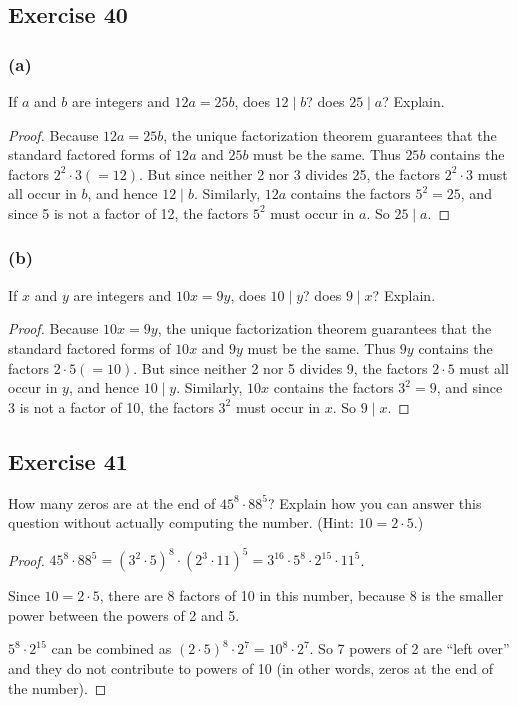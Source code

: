 \documentclass[14pt]{extarticle}
\begin{document}
\subsection{Exercise 40}
\subsubsection{(a)}
If $a$ and $b$ are integers and $12a = 25b$, does $12 \mid b$? does $25 \mid a$? Explain.

\begin{proof}
Because $12a = 25b$, the unique factorization theorem guarantees that the standard factored forms of $12a$ and $25b$ must be the same. Thus $25b$ contains the factors $2^2 \cdot 3 (=12)$. But since neither 2 nor 3 divides 25, the factors $2^2 \cdot 3$ must all occur in $b$, and hence $12\mid b$. Similarly, $12a$ contains the factors $5^2 = 25$, and since 5 is not a factor of 12, the factors $5^2$ must occur in $a$. So $25\mid a$.
\end{proof}

\subsubsection{(b)}
If $x$ and $y$ are integers and $10x = 9y$, does $10 \mid y$? does $9 \mid x$? Explain.

\begin{proof}
Because $10x = 9y$, the unique factorization theorem guarantees that the standard factored forms of $10x$ and $9y$ must be the same. Thus $9y$ contains the factors $2 \cdot 5 (=10)$. But since neither 2 nor 5 divides 9, the factors $2 \cdot 5$ must all occur in $y$, and hence $10\mid y$. Similarly, $10x$ contains the factors $3^2 = 9$, and since 3 is not a factor of 10, the factors $3^2$ must occur in $x$. So $9\mid x$.
\end{proof}

\subsection{Exercise 41}
How many zeros are at the end of $45^8 \cdot 88^5$? Explain how you can answer this question without actually computing the number. (Hint: $10 = 2\cdot 5$.)

\begin{proof}
$45^8 \cdot 88^5 =(3^2 \cdot 5)^8 \cdot (2^3 \cdot 11)^5 = 3^{16} \cdot 5^8 \cdot 2^{15} \cdot 11^5$. 

Since $10 = 2 \cdot 5$, there are 8 factors of 10 in this number, because 8 is the smaller power between the powers of 2 and 5. 

$5^8 \cdot 2^{15}$ can be combined as $(2\cdot5)^8 \cdot 2^7 = 10^8 \cdot 2^7$. So 7 powers of 2 are ``left over'' and they do not contribute to powers of 10 (in other words, zeros at the end of the number). 
\end{proof}
\end{document}
